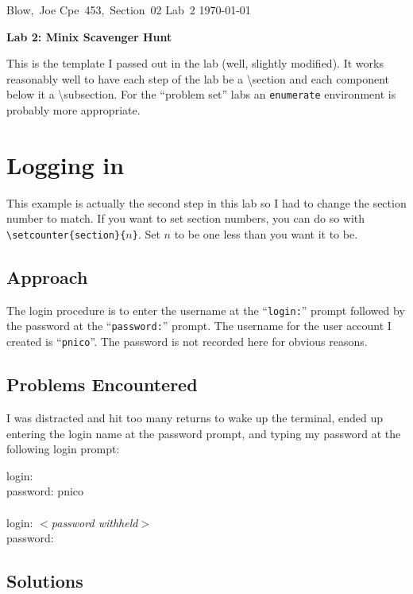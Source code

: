 \documentclass[11pt]{article}
\begin{document}
\hfill\vbox{\hbox{Blow, Joe}
		\hbox{Cpe 453, Section 02}	
		\hbox{Lab 2}	
		\hbox{\today}}\par

\bigskip
\centerline{\Large\bf Lab 2: Minix Scavenger Hunt}\par
\bigskip

This is the template I passed out in the lab (well, slightly 
modified).  It works reasonably well to have each step of the
lab be a {\textbackslash section} and each component below it
a {\textbackslash subsection}.  For the ``problem set'' labs
an {\tt enumerate} environment is probably more appropriate.


\setcounter{section}{1} %
\section{Logging in}

This example is actually the second step in this lab so I had
to change the section number to match.  If you want to
set section numbers, you can do so with 
\verb+\setcounter{section}{+$n${\tt \}}.  Set $n$ to be one less
than you want it to be.


\subsection{Approach}
  The login procedure is to enter the username at the ``{\tt login:}''
prompt followed by the password at the ``{\tt password:}'' prompt.
The username for the user account I created is ``{\tt pnico}''.  The
password is not recorded here for obvious reasons.

\subsection{Problems Encountered}

  I was distracted and hit too many returns to wake up the terminal, 
ended up entering the login name at the password prompt, and typing
my password at the following login prompt:

{\tt\begin{tabbing}
login:\\
password: pnico\\
\\
login: $<${\it password withheld}$>$\\
password:
\end{tabbing}}

\subsection{Solutions}
\end{document}
